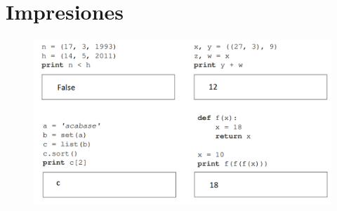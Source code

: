 \section{Impresiones}

\begin{figure}[h]
	\includegraphics[scale=0.75]{Imagenes/sol_impresiones.png}
\end{figure}
